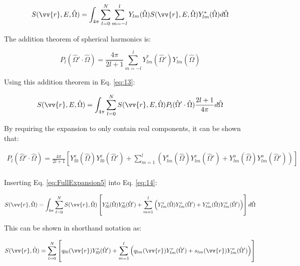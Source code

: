 \documentclass[10pt]{article}
\begin{document}
\begin{equation}
\label{eq:13}
S(\vv{r},E,\hat{\Omega})=\int_{4\pi}^{}\sum_{l=0}^{N}\sum_{m=-l}^{l}Y_{lm}(\hat{\Omega})S(\vv{r},E,\hat{\Omega})Y_{lm}^{*}(\hat{\Omega})d\hat{\Omega}
\end{equation}

The addition theorem of spherical harmonics is:

\begin{equation}
\label{eq:SHAdditionTheorem}
P_l(\hat{\Omega}'\cdot\hat{\Omega}) = \frac{4\pi}{2l+1} \sum_{m=-l}^{l} Y_{lm}^{*} (\hat{\Omega}') Y_{lm}(\hat{\Omega})
\end{equation}

Using this addition theorem in Eq. \eqref{eq:13}:

\begin{equation}
\label{eq:14}
S(\vv{r},E,\hat{\Omega})=\int_{4\pi}^{}\sum_{l=0}^{N}S(\vv{r},E,\hat{\Omega})P_l(\hat{\Omega}'\cdot\hat{\Omega})\frac{2l+1}{4\pi}d\hat{\Omega}
\end{equation}

By requiring the expansion to only contain real components, it can be shown that:

\begin{equation}
\begin{aligned}
\label{eq:FullExpansion5}
P_l(\hat{\Omega}'\cdot\hat{\Omega})=\frac{4\pi}{2l+1}\left\lbrack Y_{l0}^e(\hat{\Omega})Y_{l0}^e(\hat{\Omega}')+\sum_{m=1}^{l}\left(Y_{lm}^e(\hat{\Omega})Y_{lm}^{e}(\hat{\Omega}')+Y_{lm}^o(\hat{\Omega})Y_{lm}^{o}(\hat{\Omega}')\right)\right\rbrack\\
\end{aligned}
\end{equation}

Inserting Eq. \eqref{eq:FullExpansion5} into Eq. \eqref{eq:14}:

\begin{equation}
\label{eq:14}
S(\vv{r},\hat{\Omega})=\int_{4\pi}^{}\sum_{l=0}^{N}S(\vv{r},\hat{\Omega})\left\lbrack Y_{l0}^e(\hat{\Omega})Y_{l0}^e(\hat{\Omega}')+\sum_{m=1}^{l}\left(Y_{lm}^e(\hat{\Omega})Y_{lm}^{e}(\hat{\Omega}')+Y_{lm}^o(\hat{\Omega})Y_{lm}^{o}(\hat{\Omega}')\right)\right\rbrack d\hat{\Omega}
\end{equation}

This can be shown in shorthand notation as:

\begin{equation}
\label{eq:14}
S(\vv{r},\hat{\Omega})=\sum_{l=0}^{N}\left\lbrack q_{l0}(\vv{r})Y_{l0}^e(\hat{\Omega}')+\sum_{m=1}^{l}\left(q_{lm}(\vv{r})Y_{lm}^{e}(\hat{\Omega}')+s_{lm}(\vv{r})Y_{lm}^{o}(\hat{\Omega}')\right)\right\rbrack
\end{equation}
\end{document}
